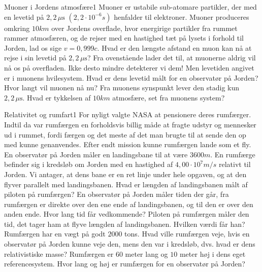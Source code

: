 \begin{opgave}{Muoner i Jordens atmosfære}{1}
	Muoner er ustabile sub-atomare partikler, der med en levetid på $2,2 \,\mu\si{\s}$ $(2,2 \cdot 10^{-6} \si{s})$ henfalder til elektroner.
	Muoner produceres omkring $10 \si{km}$ over Jordens overflade, hvor energirige partikler fra rummet rammer
	atmosfæren, og de rejser med en hastighed tæt på lysets i forhold til Jorden, lad os sige $v = 0,999c$.
	\opg Hvad er den længste afstand en muon kan nå at rejse i sin levetid på $2,2 \,\mu\si{\s}$?
	\opg Fra ovenstående lader det til, at muonerne aldrig vil nå os på overfladen. Ikke desto mindre detekterer vi
	dem! Men levetiden angivet er i muonens hvilesystem. Hvad er dens levetid målt for en observatør på
	Jorden?
	\opg Hvor langt vil muonen nå nu?
	\opg Fra muonens synspunkt lever den stadig kun $2,2 \, \mu\si{\s}$. Hvad er tykkelsen af $10 \si{km}$ atmosfære, set fra
	muonens system?
\end{opgave}

\begin{opgave}{Relativitet og rumfart}{1}
	For nyligt valgte NASA at pensionere deres rumfærger. Indtil da var rumfærgen en forholdsvis billig måde at
	fragte udstyr og mennesker ud i rummet, fordi færgen og det meste af det man brugte til at sende den op med
	kunne genanvendes. Efter endt mission kunne rumfærgen lande som et fly.\\
	\indent
	En observatør på Jorden måler en landingsbane til at være $3600 \si{m}$. En rumfærge befinder sig i kredsløb om
	Jorden med en hastighed af $4,00 \cdot 10^7 \si{m/s}$ relativt til Jorden. Vi antager, at dens bane er en ret linje under hele
	opgaven, og at den flyver parallelt med landingsbanen.
	\opg Hvad er længden af landingsbanen målt af piloten på rumfærgen?
	\opg En observatør på Jorden måler tiden der går, fra rumfærgen er direkte over den ene ende af landingsbanen,
	og til den er over den anden ende. Hvor lang tid får vedkommende?
	\opg Piloten på rumfærgen måler den tid, det tager ham at flyve længden af landingsbanen. Hvilken værdi får
	han?
	\opg Rumfærgen har en vægt på godt $2000$ tons. Hvad ville rumfærgen veje, hvis en observatør på Jorden
	kunne veje den, mens den var i kredsløb, dvs. hvad er dens relativistiske masse?
	\opg Rumfærgen er $60$ meter lang og $10$ meter høj i dens eget referencesystem. Hvor lang og høj er rumfærgen
	for en observatør på Jorden?
\end{opgave}

